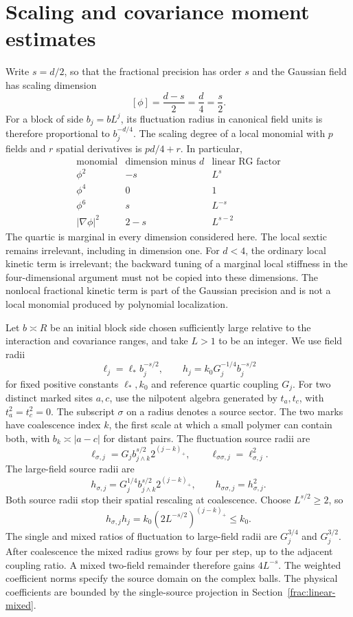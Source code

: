 \documentclass[11pt]{article}
\begin{document}
\section{Scaling and covariance moment estimates}
\label{frac:scaling}
Write \(s=d/2\), so that the fractional precision has order \(s\)
and the Gaussian field has scaling dimension
\[
 [\phi]=\frac{d-s}{2}=\frac d4=\frac s2.
\]
For a block of side \(b_j=bL^j\), its fluctuation radius in
canonical field units is therefore proportional to \(b_j^{-d/4}\).
The scaling degree of a local monomial with \(p\) fields and
\(r\) spatial derivatives is \(p d/4+r\). In particular,
\[
 \begin{array}{c|c|c}
 \text{monomial}&\text{dimension minus }d&\text{linear RG factor}\\ \hline
 \phi^2&-s&L^s\\
 \phi^4&0&1\\
 \phi^6&s&L^{-s}\\
 |\nabla\phi|^2&2-s&L^{s-2}
 \end{array}
\]
The quartic is marginal in every dimension considered here. The local
sextic remains irrelevant, including in dimension one. For \(d<4\),
the ordinary local kinetic term is irrelevant; the backward tuning
of a marginal local stiffness in the four-dimensional argument must
not be copied into these dimensions. The nonlocal fractional kinetic
term is part of the Gaussian precision and is not a local monomial
produced by polynomial localization.

Let \(b\asymp R\) be an initial block side chosen sufficiently
large relative to the interaction and covariance ranges, and take
\(L>1\) to be an integer. We use field radii
\[
 \ell_j=\ell_*b_j^{-s/2},\qquad h_j=k_0G_j^{-1/4}b_j^{-s/2}
\]
for fixed positive constants \(\ell_*,k_0\) and reference quartic
coupling \(G_j\). For two distinct marked sites \(a,c\), use the
nilpotent algebra generated by \(t_a,t_c\), with \(t_a^2=t_c^2=0\).
The subscript \(\sigma\) on a radius denotes a source sector. The two marks have coalescence
index \(k\), the first scale at which a small polymer can contain
both, with \(b_k\asymp |a-c|\) for distant pairs. The fluctuation
source radii are
\[
 \ell_{\sigma,j}=G_j b_{j\wedge k}^{s/2}2^{(j-k)_+},
 \qquad \ell_{\sigma\sigma,j}=\ell_{\sigma,j}^2.
\]
The large-field source radii are
\[
 h_{\sigma,j}=G_j^{1/4}b_{j\wedge k}^{s/2}2^{(j-k)_+},\qquad
 h_{\sigma\sigma,j}=h_{\sigma,j}^2.
\]
Both source radii stop their spatial rescaling at coalescence.
Choose \(L^{s/2}\ge2\), so
\[
 h_{\sigma,j}h_j=k_0(2L^{-s/2})^{(j-k)_+}\le k_0 .
\]
The single and mixed ratios of fluctuation to large-field radii are
\(G_j^{3/4}\) and \(G_j^{3/2}\). After coalescence the mixed radius
grows by four per step, up to the adjacent coupling ratio. A mixed
two-field remainder therefore gains \(4L^{-s}\). The weighted
coefficient norms specify the source domain on the complex balls.
The physical coefficients are bounded by the single-source projection
in Section~\ref{frac:linear-mixed}.
\end{document}
